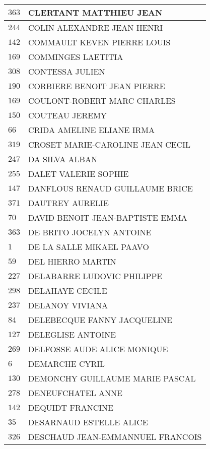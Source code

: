 \begin{xltabular}{\linewidth}{|l|X|}
    $363$ & CLERTANT MATTHIEU JEAN \\
    \hline
    $244$ & COLIN ALEXANDRE JEAN HENRI \\
    \hline
    $142$ & COMMAULT KEVEN PIERRE LOUIS \\
    \hline
    $169$ & COMMINGES LAETITIA \\
    \hline
    $308$ & CONTESSA JULIEN \\
    \hline
    $190$ & CORBIERE BENOIT JEAN PIERRE \\
    \hline
    $169$ & COULONT-ROBERT MARC CHARLES \\
    \hline
    $150$ & COUTEAU JEREMY \\
    \hline
    $66$ & CRIDA AMELINE ELIANE IRMA \\
    \hline
    $319$ & CROSET MARIE-CAROLINE JEAN CECIL \\
    \hline
    $247$ & DA SILVA ALBAN \\
    \hline
    $255$ & DALET VALERIE SOPHIE \\
    \hline
    $147$ & DANFLOUS RENAUD GUILLAUME BRICE \\
    \hline
    $371$ & DAUTREY AURELIE \\
    \hline
    $70$ & DAVID BENOIT JEAN-BAPTISTE EMMA \\
    \hline
    $363$ & DE BRITO JOCELYN ANTOINE \\
    \hline
    $1$ & DE LA SALLE MIKAEL PAAVO \\
    \hline
    $59$ & DEL HIERRO MARTIN \\
    \hline
    $227$ & DELABARRE LUDOVIC PHILIPPE \\
    \hline
    $298$ & DELAHAYE CECILE \\
    \hline
    $237$ & DELANOY VIVIANA \\
    \hline
    $84$ & DELEBECQUE FANNY JACQUELINE \\
    \hline
    $127$ & DELEGLISE ANTOINE \\
    \hline
    $269$ & DELFOSSE AUDE ALICE MONIQUE \\
    \hline
    $6$ & DEMARCHE CYRIL \\
    \hline
    $130$ & DEMONCHY GUILLAUME MARIE PASCAL \\
    \hline
    $278$ & DENEUFCHATEL ANNE \\
    \hline
    $142$ & DEQUIDT FRANCINE \\
    \hline
    $35$ & DESARNAUD ESTELLE ALICE \\
    \hline
    $326$ & DESCHAUD JEAN-EMMANNUEL FRANCOIS \\

\end{xltabular}
